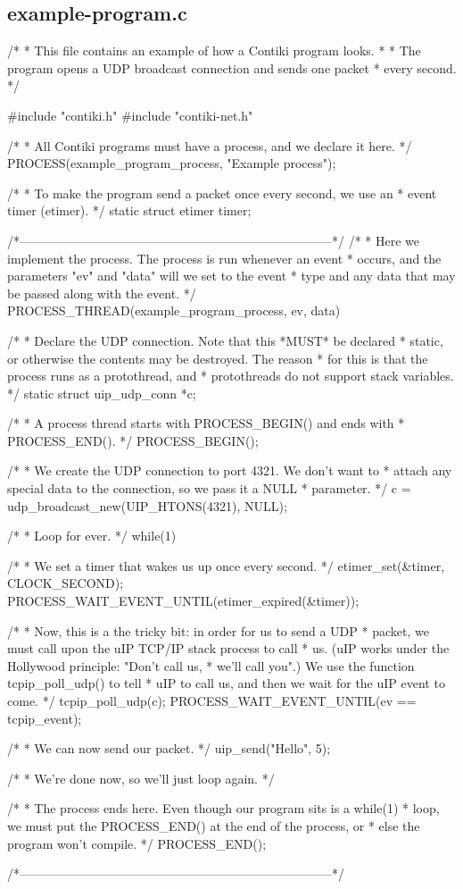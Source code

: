 \hypertarget{a00002}{\subsection{example-\/program.\-c}
}

\begin{DoxyCodeInclude}
/*
 * This file contains an example of how a Contiki program looks.
 *
 * The program opens a UDP broadcast connection and sends one packet
 * every second.
 */

#include "contiki.h"
#include "contiki-net.h"

/*
 * All Contiki programs must have a process, and we declare it here.
 */
PROCESS(example_program_process, "Example process");

/*
 * To make the program send a packet once every second, we use an
 * event timer (etimer).
 */
static struct etimer timer;

/*---------------------------------------------------------------------------*/
/*
 * Here we implement the process. The process is run whenever an event
 * occurs, and the parameters "ev" and "data" will we set to the event
 * type and any data that may be passed along with the event.
 */
PROCESS_THREAD(example_program_process, ev, data)
{
  /*
   * Declare the UDP connection. Note that this *MUST* be declared
   * static, or otherwise the contents may be destroyed. The reason
   * for this is that the process runs as a protothread, and
   * protothreads do not support stack variables.
   */
  static struct uip_udp_conn *c;
  
  /*
   * A process thread starts with PROCESS_BEGIN() and ends with
   * PROCESS_END().
   */  
  PROCESS_BEGIN();

  /*
   * We create the UDP connection to port 4321. We don't want to
   * attach any special data to the connection, so we pass it a NULL
   * parameter.
   */
  c = udp_broadcast_new(UIP_HTONS(4321), NULL);
  
  /*
   * Loop for ever.
   */
  while(1) {

    /*
     * We set a timer that wakes us up once every second. 
     */
    etimer_set(&timer, CLOCK_SECOND);
    PROCESS_WAIT_EVENT_UNTIL(etimer_expired(&timer));

    /*
     * Now, this is a the tricky bit: in order for us to send a UDP
     * packet, we must call upon the uIP TCP/IP stack process to call
     * us. (uIP works under the Hollywood principle: "Don't call us,
     * we'll call you".) We use the function tcpip_poll_udp() to tell
     * uIP to call us, and then we wait for the uIP event to come.
     */
    tcpip_poll_udp(c);
    PROCESS_WAIT_EVENT_UNTIL(ev == tcpip_event);

    /*
     * We can now send our packet.
     */
    uip_send("Hello", 5);

    /*
     * We're done now, so we'll just loop again.
     */
  }

  /*
   * The process ends here. Even though our program sits is a while(1)
   * loop, we must put the PROCESS_END() at the end of the process, or
   * else the program won't compile.
   */
  PROCESS_END();
}
/*---------------------------------------------------------------------------*/
\end{DoxyCodeInclude}
 